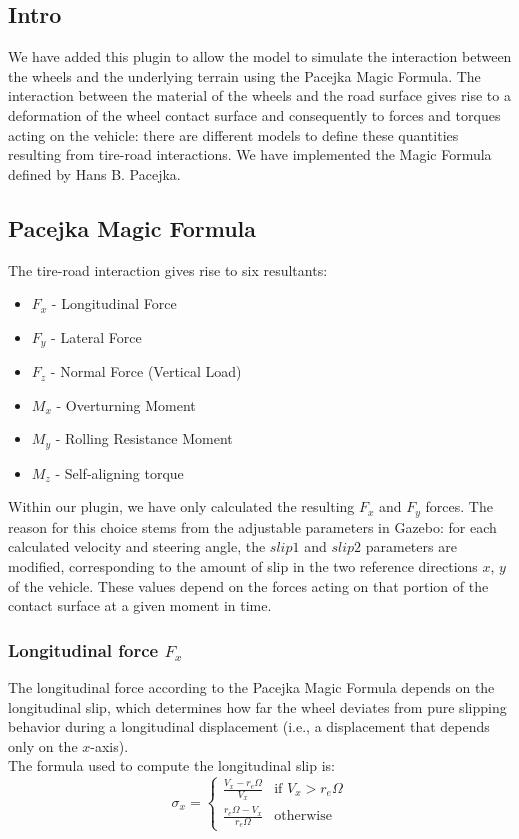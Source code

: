 \subsection{Intro}

We have added this plugin to allow the model to simulate the interaction between the wheels and the underlying terrain using the Pacejka Magic Formula.
The interaction between the material of the wheels and the road surface gives rise to a deformation of the wheel contact surface and consequently to forces and torques acting on the vehicle: there are different models to define these quantities resulting from tire-road interactions. We have implemented the Magic Formula defined by Hans B. Pacejka.

\subsection{Pacejka Magic Formula}
The tire-road interaction gives rise to six resultants:
\begin{itemize}
	\item $F_x$ - Longitudinal Force
	\item $F_y$ - Lateral Force
	\item $F_z$ - Normal Force (Vertical Load)
	\item $M_x$ - Overturning Moment
	\item $M_y$ - Rolling Resistance Moment
	\item $M_z$ - Self-aligning torque
\end{itemize}
Within our plugin, we have only calculated the resulting $F_x$ and $F_y$ forces. The reason for this choice stems from the adjustable parameters in Gazebo: for each calculated velocity and steering angle, the $slip1$ and $slip2$ parameters are modified, corresponding to the amount of slip in the two reference directions $x$, $y$ of the vehicle. These values depend on the forces acting on that portion of the contact surface at a given moment in time.

\subsubsection{Longitudinal force $F_x$}
The longitudinal force according to the Pacejka Magic Formula depends on the longitudinal slip, which determines how far the wheel deviates from pure slipping behavior during a longitudinal displacement (i.e., a displacement that depends only on the $x$-axis).
\\
The formula used to compute the longitudinal slip is:
\[
\sigma_x = 
  \begin{cases} 
	\frac{V_x - r_e\Omega}{V_x} & \text{if $V_x > r_e\Omega$} \\
	\frac{r_e\Omega - V_x}{r_e\Omega} & \text{otherwise}
  \end{cases}
\] \\


